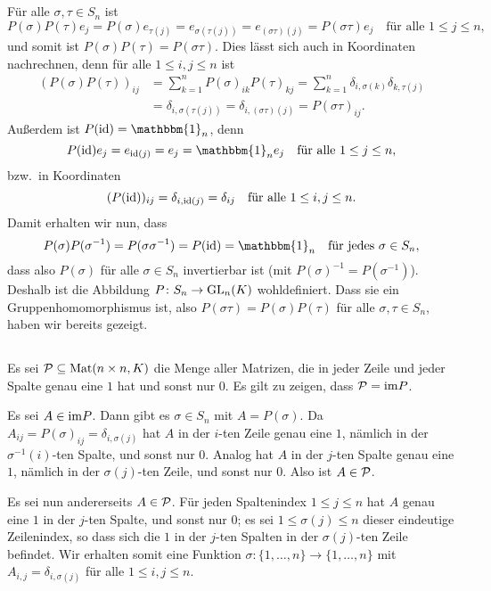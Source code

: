 \documentclass[a4paper,10pt]{article}
\begin{document}
\subsection{}
Für alle $\sigma, \tau \in S_n$ ist
\[
 P(\sigma) P(\tau) e_j
 = P(\sigma) e_{\tau(j)}
 = e_{\sigma(\tau(j))}
 = e_{(\sigma \tau)(j)}
 = P(\sigma \tau) e_j
 \quad
 \text{für alle $1 \leq j \leq n$},
\]
und somit ist $P(\sigma)P(\tau) = P(\sigma \tau)$. Dies lässt sich auch in Koordinaten nachrechnen, denn für alle $1 \leq i,j \leq n$ ist
\begin{align*}
 (P(\sigma)P(\tau))_{ij}
 &= \sum_{k=1}^n P(\sigma)_{ik} P(\tau)_{kj}
 = \sum_{k=1}^n \delta_{i,\sigma(k)} \delta_{k,\tau(j)} \\
 &= \delta_{i,\sigma(\tau(j))}
 = \delta_{i,(\sigma \tau)(j)}
 = P(\sigma \tau)_{ij}.
\end{align*}
Außerdem ist $P(\id) = \mathbbm{1}_n$, denn
\[
 P(\id) e_j = e_{\id(j)} = e_j = \mathbbm{1}_n e_j
 \quad
 \text{für alle $1 \leq j \leq n$},
\]
bzw.\ in Koordinaten
\[
 (P(\mathrm{id}))_{ij} = \delta_{i,\mathrm{id}(j)} = \delta_{ij}
 \quad
 \text{für alle $1 \leq i,j \leq n$}.
\]
Damit erhalten wir nun, dass
\[
 P(\sigma) P(\sigma^{-1})
 = P(\sigma \sigma^{-1})
 = P(\id)
 = \mathbbm{1}_n
 \quad
 \text{für jedes $\sigma \in S_n$},
\]
dass also $P(\sigma)$ für alle $\sigma \in S_n$ invertierbar ist (mit $P(\sigma)^{-1} = P(\sigma^{-1})$). Deshalb ist die Abbildung $P \colon S_n \to \mathrm{GL}_n(K)$ wohldefiniert. Dass sie ein Gruppenhomomorphismus ist, also $P(\sigma \tau) = P(\sigma) P(\tau)$ für alle $\sigma, \tau \in S_n$, haben wir bereits gezeigt.



\subsection{}
Es sei $\mathcal{P} \subseteq \mathrm{Mat}(n \times n, K)$ die Menge aller Matrizen, die in jeder Zeile und jeder Spalte genau eine $1$ hat und sonst nur $0$. Es gilt zu zeigen, dass $\mathcal{P} = \mathrm{im} P$.

Es sei $A \in \mathrm{im} P$. Dann gibt es $\sigma \in S_n$ mit $A = P(\sigma)$. Da $A_{ij} = P(\sigma)_{ij} = \delta_{i,\sigma(j)}$ hat $A$ in der $i$-ten Zeile genau eine $1$, nämlich in der $\sigma^{-1}(i)$-ten Spalte, und sonst nur $0$. Analog hat $A$ in der $j$-ten Spalte genau eine $1$, nämlich in der $\sigma(j)$-ten Zeile, und sonst nur $0$. Also ist $A \in \mathcal{P}$.

Es sei nun andererseits $A \in \mathcal{P}$. Für jeden Spaltenindex $1 \leq j \leq n$ hat $A$ genau eine $1$ in der $j$-ten Spalte, und sonst nur $0$; es sei $1 \leq \sigma(j) \leq n$ dieser eindeutige Zeilenindex, so dass sich die $1$ in der $j$-ten Spalten in der $\sigma(j)$-ten Zeile befindet. Wir erhalten somit eine Funktion $\sigma \colon \{1, \dotsc, n\} \to \{1, \dotsc, n\}$ mit $A_{i,j} = \delta_{i,\sigma(j)}$ für alle $1 \leq i,j \leq n$.
\end{document}
